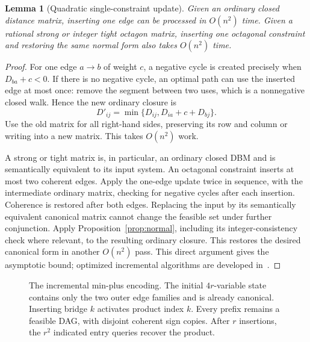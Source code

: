 \documentclass[manuscript,11pt,screen,nonacm]{acmart}
\newtheorem{lemma}[theorem]{Lemma}
\theoremstyle{definition}
\begin{document}
\begin{lemma}[Quadratic single-constraint update]\label{lem:incrupper}
Given an ordinary closed distance matrix, inserting one edge can be processed in $O(n^2)$ time. Given a rational strong or integer tight octagon matrix, inserting one octagonal constraint and restoring the same normal form also takes $O(n^2)$ time.
\end{lemma}
\begin{proof}
For one edge $a\to b$ of weight $c$, a negative cycle is created precisely when $D_{ba}+c<0$. If there is no negative cycle, an optimal path can use the inserted edge at most once: remove the segment between two uses, which is a nonnegative closed walk. Hence the new ordinary closure is
\begin{equation}\label{eq:update}
 D'_{ij}=\min\{D_{ij},D_{ia}+c+D_{bj}\}.
\end{equation}
Use the old matrix for all right-hand sides, preserving its row and column or writing into a new matrix. This takes $O(n^2)$ work.

A strong or tight matrix is, in particular, an ordinary closed DBM and is semantically equivalent to its input system. An octagonal constraint inserts at most two coherent edges. Apply the one-edge update twice in sequence, with the intermediate ordinary matrix, checking for negative cycles after each insertion. Coherence is restored after both edges. Replacing the input by its semantically equivalent canonical matrix cannot change the feasible set under further conjunction. Apply Proposition~\ref{prop:normal}, including its integer-consistency check where relevant, to the resulting ordinary closure. This restores the desired canonical form in another $O(n^2)$ pass. This direct argument gives the asymptotic bound; optimized incremental algorithms are developed in~\cite{crk2019}.
\end{proof}

\begin{figure}[H]
\centering

\caption{The incremental min-plus encoding. The initial $4r$-variable state contains only the two outer edge families and is already canonical. Inserting bridge $k$ activates product index $k$. Every prefix remains a feasible DAG, with disjoint coherent sign copies. After $r$ insertions, the $r^2$ indicated entry queries recover the product.}
\label{fig:incremental}
\end{figure}
\end{document}

